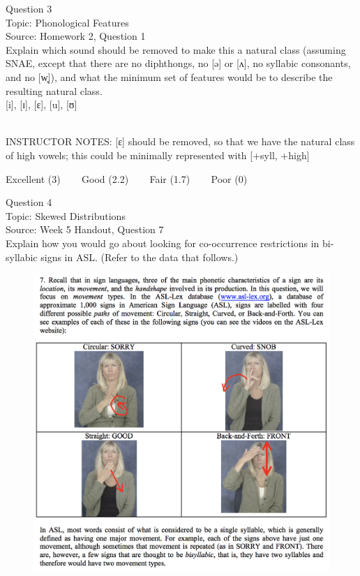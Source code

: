 \documentclass[12pt]{article}
\begin{document}
{\large Question 3}\\

Topic: Phonological Features\\
Source: Homework 2, Question 1\\

Explain which sound should be removed to make this a natural class (assuming SNAE, except that there are no diphthongs, no [ə] or [ʌ], no syllabic consonants, and no [w̥]), and what the minimum set of features would be to describe the resulting natural class.\\

{[i]}, {[ɪ]}, {[ɛ]}, {[u]}, {[ʊ]}


~\\
INSTRUCTOR NOTES: [ɛ] should be removed, so that we have the natural class of high vowels; this could be minimally represented with [+syll, +high]


\vfill
Excellent (3) ~~~ Good (2.2) ~~~ Fair (1.7) ~~~ Poor (0)
\newpage

{\large Question 4}\\

Topic: Skewed Distributions\\
Source: Week 5 Handout, Question 7\\

Explain how you would go about looking for co-occurrence restrictions in bi-syllabic signs in ASL. (Refer to the data that follows.)\\

\begin{figure}[H]
\includegraphics{../images/ASL_movement.png}
\end{figure}
\end{document}

